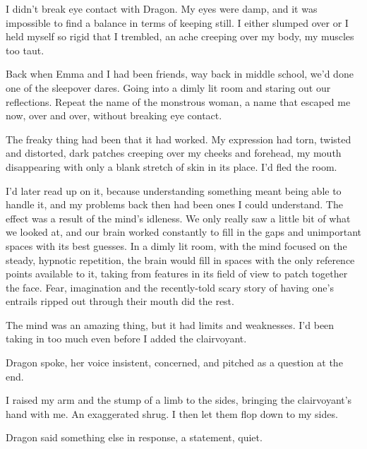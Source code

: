 





I didn't break eye contact with Dragon.  My eyes were damp, and it was impossible to find a balance in terms of keeping still.  I either slumped over or I held myself so rigid that I trembled, an ache creeping over my body, my muscles too taut.



Back when Emma and I had been friends, way back in middle school, we'd done one of the sleepover dares.  Going into a dimly lit room and staring out our reflections.  Repeat the name of the monstrous woman, a name that escaped me now, over and over, without breaking eye contact.



The freaky thing had been that it had worked.  My expression had torn, twisted and distorted, dark patches creeping over my cheeks and forehead, my mouth disappearing with only a blank stretch of skin in its place.  I'd fled the room.



I'd later read up on it, because understanding something meant being able to handle it, and my problems back then had been ones I could understand.  The effect was a result of the mind's idleness.  We only really saw a little bit of what we looked at, and our brain worked constantly to fill in the gaps and unimportant spaces with its best guesses.  In a dimly lit room, with the mind focused on the steady, hypnotic repetition, the brain would fill in spaces with the only reference points available to it, taking from features in its field of view to patch together the face.  Fear, imagination and the recently-told scary story of having one's entrails ripped out through their mouth did the rest.



The mind was an amazing thing, but it had limits and weaknesses.  I'd been taking in too much even before I added the clairvoyant.



Dragon spoke, her voice insistent, concerned, and pitched as a question at the end.



I raised my arm and the stump of a limb to the sides, bringing the clairvoyant's hand with me.  An exaggerated shrug.  I then let them flop down to my sides.



Dragon said something else in response, a statement, quiet.



